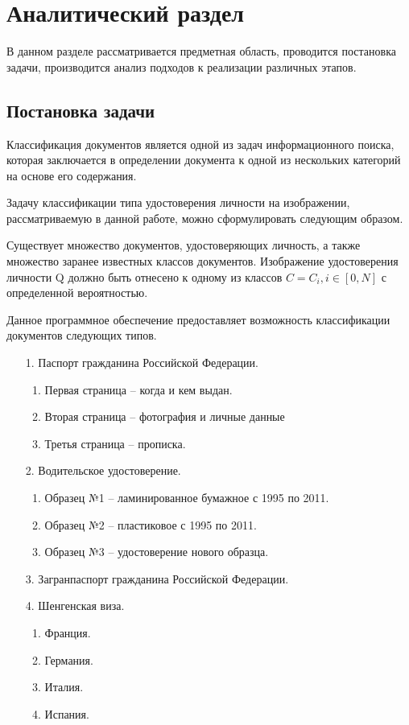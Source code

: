 \chapter{\textbf{Аналитический раздел}}

В данном разделе рассматривается предметная область, проводится постановка задачи, производится анализ подходов к реализации различных этапов.

\section{Постановка задачи}

Классификация документов является одной из задач информационного поиска, которая заключается в определении документа к одной из нескольких категорий на основе его содержания.

Задачу классификации типа удостоверения личности на изображении, рассматриваемую в данной работе, можно сформулировать следующим образом.

Существует множество документов, удостоверяющих личность, а также множество заранее известных классов документов. Изображение удостоверения личности Q должно быть отнесено к одному из классов $C=C_i, i \in [0, N]$ с определенной вероятностью.

Данное программное обеспечение предоставляет возможность классификации документов следующих типов. 
\begin{enumerate}
\item[1.] Паспорт гражданина Российской Федерации.
\begin{enumerate}
\item Первая страница -- когда и кем выдан.
\item Вторая страница -- фотография и личные данные
\item Третья страница -- прописка.
\end{enumerate}
\item[2.] Водительское удостоверение.
\begin{enumerate}
\item Образец №1 -- ламинированное бумажное с 1995 по 2011.
\item Образец №2 -- пластиковое с 1995 по 2011.
\item Образец №3 -- удостоверение нового образца.
\end{enumerate}
\item[3.] Загранпаспорт гражданина Российской Федерации.
\item[4.] Шенгенская виза.
\begin{enumerate}
\item Франция.
\item Германия.
\item Италия.
\item Испания.
\end{enumerate}
\end{enumerate}

